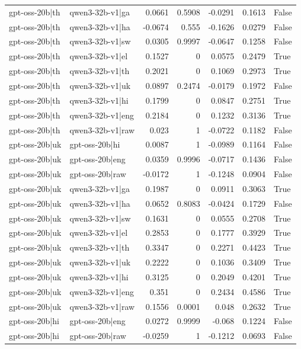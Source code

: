 \begin{table}
\begin{tabular}{l l r r r r l}
gpt-oss-20b|th & qwen3-32b-v1|ga & 0.0661 & 0.5908 & -0.0291 & 0.1613 & False \\
gpt-oss-20b|th & qwen3-32b-v1|ha & -0.0674 & 0.555 & -0.1626 & 0.0279 & False \\
gpt-oss-20b|th & qwen3-32b-v1|sw & 0.0305 & 0.9997 & -0.0647 & 0.1258 & False \\
gpt-oss-20b|th & qwen3-32b-v1|el & 0.1527 & 0 & 0.0575 & 0.2479 & True \\
gpt-oss-20b|th & qwen3-32b-v1|th & 0.2021 & 0 & 0.1069 & 0.2973 & True \\
gpt-oss-20b|th & qwen3-32b-v1|uk & 0.0897 & 0.2474 & -0.0179 & 0.1972 & False \\
gpt-oss-20b|th & qwen3-32b-v1|hi & 0.1799 & 0 & 0.0847 & 0.2751 & True \\
gpt-oss-20b|th & qwen3-32b-v1|eng & 0.2184 & 0 & 0.1232 & 0.3136 & True \\
gpt-oss-20b|th & qwen3-32b-v1|raw & 0.023 & 1 & -0.0722 & 0.1182 & False \\
gpt-oss-20b|uk & gpt-oss-20b|hi & 0.0087 & 1 & -0.0989 & 0.1164 & False \\
gpt-oss-20b|uk & gpt-oss-20b|eng & 0.0359 & 0.9996 & -0.0717 & 0.1436 & False \\
gpt-oss-20b|uk & gpt-oss-20b|raw & -0.0172 & 1 & -0.1248 & 0.0904 & False \\
gpt-oss-20b|uk & qwen3-32b-v1|ga & 0.1987 & 0 & 0.0911 & 0.3063 & True \\
gpt-oss-20b|uk & qwen3-32b-v1|ha & 0.0652 & 0.8083 & -0.0424 & 0.1729 & False \\
gpt-oss-20b|uk & qwen3-32b-v1|sw & 0.1631 & 0 & 0.0555 & 0.2708 & True \\
gpt-oss-20b|uk & qwen3-32b-v1|el & 0.2853 & 0 & 0.1777 & 0.3929 & True \\
gpt-oss-20b|uk & qwen3-32b-v1|th & 0.3347 & 0 & 0.2271 & 0.4423 & True \\
gpt-oss-20b|uk & qwen3-32b-v1|uk & 0.2222 & 0 & 0.1036 & 0.3409 & True \\
gpt-oss-20b|uk & qwen3-32b-v1|hi & 0.3125 & 0 & 0.2049 & 0.4201 & True \\
gpt-oss-20b|uk & qwen3-32b-v1|eng & 0.351 & 0 & 0.2434 & 0.4586 & True \\
gpt-oss-20b|uk & qwen3-32b-v1|raw & 0.1556 & 0.0001 & 0.048 & 0.2632 & True \\
gpt-oss-20b|hi & gpt-oss-20b|eng & 0.0272 & 0.9999 & -0.068 & 0.1224 & False \\
gpt-oss-20b|hi & gpt-oss-20b|raw & -0.0259 & 1 & -0.1212 & 0.0693 & False \\

\end{tabular}
\end{table}
